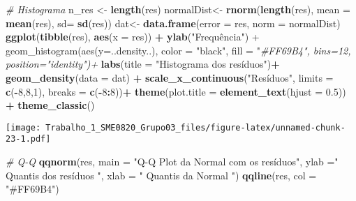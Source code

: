 \documentclass[
]{article}
\newenvironment{Shaded}{\begin{snugshade}}{\end{snugshade}}
\newcommand{\CommentTok}[1]{\textcolor[rgb]{0.56,0.35,0.01}{\textit{#1}}}
\newcommand{\DataTypeTok}[1]{\textcolor[rgb]{0.13,0.29,0.53}{#1}}
\newcommand{\DecValTok}[1]{\textcolor[rgb]{0.00,0.00,0.81}{#1}}
\newcommand{\FloatTok}[1]{\textcolor[rgb]{0.00,0.00,0.81}{#1}}
\newcommand{\KeywordTok}[1]{\textcolor[rgb]{0.13,0.29,0.53}{\textbf{#1}}}
\newcommand{\NormalTok}[1]{#1}
\newcommand{\OperatorTok}[1]{\textcolor[rgb]{0.81,0.36,0.00}{\textbf{#1}}}
\newcommand{\StringTok}[1]{\textcolor[rgb]{0.31,0.60,0.02}{#1}}
\begin{document}
\begin{Shaded}
\begin{Highlighting}[]
\CommentTok{# Histograma}
\NormalTok{n_res <-}\StringTok{ }\KeywordTok{length}\NormalTok{(res)}
\NormalTok{normalDist<-}\StringTok{ }\KeywordTok{rnorm}\NormalTok{(}\KeywordTok{length}\NormalTok{(res), }\DataTypeTok{mean =}  \KeywordTok{mean}\NormalTok{(res), }\DataTypeTok{sd=} \KeywordTok{sd}\NormalTok{(res))}
\NormalTok{dat<-}\StringTok{ }\KeywordTok{data.frame}\NormalTok{(}\DataTypeTok{error =}\NormalTok{ res, }\DataTypeTok{norm =}\NormalTok{ normalDist)}
\KeywordTok{ggplot}\NormalTok{(}\KeywordTok{tibble}\NormalTok{(res), }\KeywordTok{aes}\NormalTok{(}\DataTypeTok{x =}\NormalTok{ res)) }\OperatorTok{+}
\StringTok{  }\KeywordTok{ylab}\NormalTok{(}\StringTok{"Frequência") +}
\StringTok{  geom_histogram(aes(y=..density..), color = "}\NormalTok{black}\StringTok{", fill = "}\CommentTok{#FF69B4", bins=12, position="identity")+}
  \KeywordTok{labs}\NormalTok{(}\DataTypeTok{title =} \StringTok{"Histograma dos resíduos"}\NormalTok{)}\OperatorTok{+}
\StringTok{  }\KeywordTok{geom_density}\NormalTok{(}\DataTypeTok{data =}\NormalTok{ dat) }\OperatorTok{+}
\StringTok{  }\KeywordTok{scale_x_continuous}\NormalTok{(}\StringTok{"Resíduos"}\NormalTok{, }\DataTypeTok{limits =} \KeywordTok{c}\NormalTok{(}\OperatorTok{-}\DecValTok{8}\NormalTok{,}\DecValTok{8}\NormalTok{,}\DecValTok{1}\NormalTok{), }\DataTypeTok{breaks =} \KeywordTok{c}\NormalTok{(}\OperatorTok{-}\DecValTok{8}\OperatorTok{:}\DecValTok{8}\NormalTok{))}\OperatorTok{+}
\StringTok{  }\KeywordTok{theme}\NormalTok{(}\DataTypeTok{plot.title =} \KeywordTok{element_text}\NormalTok{(}\DataTypeTok{hjust =} \FloatTok{0.5}\NormalTok{)) }\OperatorTok{+}
\StringTok{  }\KeywordTok{theme_classic}\NormalTok{()}
\end{Highlighting}
\end{Shaded}

\texttt{[image: Trabalho\_1\_SME0820\_Grupo03\_files/figure-latex/unnamed-chunk-23-1.pdf]}

\begin{Shaded}
\begin{Highlighting}[]
\CommentTok{# Q-Q}
\KeywordTok{qqnorm}\NormalTok{(res, }\DataTypeTok{main =} \StringTok{"Q-Q Plot da Normal com os resíduos"}\NormalTok{, }\DataTypeTok{ylab =}\StringTok{" Quantis dos resíduos "}\NormalTok{, }\DataTypeTok{xlab =} \StringTok{" Quantis da Normal "}\NormalTok{)}
\KeywordTok{qqline}\NormalTok{(res, }\DataTypeTok{col =} \StringTok{"#FF69B4"}\NormalTok{)}
\end{Highlighting}
\end{Shaded}
\end{document}
